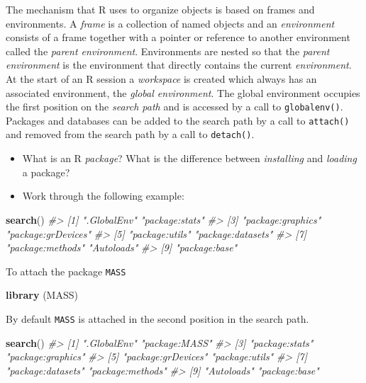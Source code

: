 \documentclass[
]{book}
\newenvironment{Shaded}{\begin{snugshade}}{\end{snugshade}}
\newcommand{\CommentTok}[1]{\textcolor[rgb]{0.56,0.35,0.01}{\textit{#1}}}
\newcommand{\FunctionTok}[1]{\textcolor[rgb]{0.13,0.29,0.53}{\textbf{#1}}}
\newcommand{\NormalTok}[1]{#1}
\providecommand{\tightlist}{%
  \setlength{\itemsep}{0pt}\setlength{\parskip}{0pt}}
\begin{document}
The mechanism that R uses to organize objects is based on frames and environments. A \emph{{frame}} is a collection of named objects and an \emph{{environment}} consists of a frame together with a pointer or reference to another environment called the \emph{{parent environment}}. Environments are nested so that the \emph{{parent environment}} is the environment that directly contains the current \emph{{environment}}. At the start of an R session a \emph{{workspace}} is created which always has an associated environment, the \emph{{global environment}}. The global environment occupies the first position on the \emph{{search path}} and is accessed by a call to \texttt{globalenv()}. Packages and databases can be added to the search path by a call to \texttt{attach()} and removed from the search path by a call to \texttt{detach()}.

\begin{itemize}
\tightlist
\item
  What is an R \emph{{package}}? What is the difference between \emph{{installing}} and \emph{{loading}} a package?
\item
  Work through the following example:
\end{itemize}

\begin{Shaded}
\begin{Highlighting}[]
\FunctionTok{search}\NormalTok{()}
\CommentTok{\#\textgreater{} [1] ".GlobalEnv"        "package:stats"    }
\CommentTok{\#\textgreater{} [3] "package:graphics"  "package:grDevices"}
\CommentTok{\#\textgreater{} [5] "package:utils"     "package:datasets" }
\CommentTok{\#\textgreater{} [7] "package:methods"   "Autoloads"        }
\CommentTok{\#\textgreater{} [9] "package:base"}
\end{Highlighting}
\end{Shaded}

To attach the package \texttt{MASS}

\begin{Shaded}
\begin{Highlighting}[]
\FunctionTok{library}\NormalTok{ (MASS)}
\end{Highlighting}
\end{Shaded}

By default \texttt{MASS} is attached in the second position in the search path.

\begin{Shaded}
\begin{Highlighting}[]
\FunctionTok{search}\NormalTok{()}
\CommentTok{\#\textgreater{}  [1] ".GlobalEnv"        "package:MASS"     }
\CommentTok{\#\textgreater{}  [3] "package:stats"     "package:graphics" }
\CommentTok{\#\textgreater{}  [5] "package:grDevices" "package:utils"    }
\CommentTok{\#\textgreater{}  [7] "package:datasets"  "package:methods"  }
\CommentTok{\#\textgreater{}  [9] "Autoloads"         "package:base"}
\end{Highlighting}
\end{Shaded}
\end{document}
